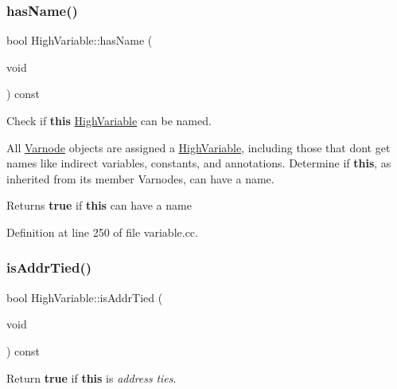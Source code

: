 \mbox{\label{class_high_variable_a7c47097883b6350cfbb630f79f529768}} 
\subsubsection{\texorpdfstring{hasName()}{hasName()}}
{\footnotesize\ttfamily bool High\+Variable\+::has\+Name (\begin{DoxyParamCaption}\item[{void}]{ }\end{DoxyParamCaption}) const}



Check if {\bfseries{this}} \mbox{\hyperlink{class_high_variable}{High\+Variable}} can be named. 

All \mbox{\hyperlink{class_varnode}{Varnode}} objects are assigned a \mbox{\hyperlink{class_high_variable}{High\+Variable}}, including those that don\textquotesingle{}t get names like indirect variables, constants, and annotations. Determine if {\bfseries{this}}, as inherited from its member Varnodes, can have a name. \begin{DoxyReturn}{Returns}
{\bfseries{true}} if {\bfseries{this}} can have a name 
\end{DoxyReturn}


Definition at line 250 of file variable.\+cc.

\mbox{\label{class_high_variable_ab6344b0a90cd3b1f7371541ec0c77255}} 
\subsubsection{\texorpdfstring{isAddrTied()}{isAddrTied()}}
{\footnotesize\ttfamily bool High\+Variable\+::is\+Addr\+Tied (\begin{DoxyParamCaption}\item[{void}]{ }\end{DoxyParamCaption}) const\hspace{0.3cm}{\ttfamily [inline]}}



Return {\bfseries{true}} if {\bfseries{this}} is {\itshape address} {\itshape ties}. 



